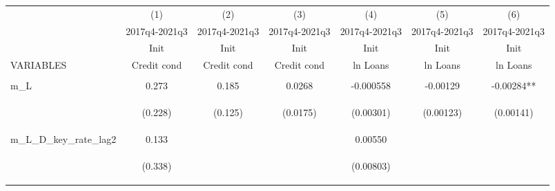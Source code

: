\documentclass[]{article}
\begin{document}
\begin{center}
\begin{tabular}{lcccccc} \hline
 & (1) & (2) & (3) & (4) & (5) & (6) \\
 & 2017q4-2021q3 & 2017q4-2021q3 & 2017q4-2021q3 & 2017q4-2021q3 & 2017q4-2021q3 & 2017q4-2021q3 \\
 & Init & Init & Init & Init & Init & Init \\
VARIABLES & Credit cond & Credit cond & Credit cond & ln Loans & ln Loans & ln Loans \\ \hline
\vspace{4pt} & \begin{footnotesize}\end{footnotesize} & \begin{footnotesize}\end{footnotesize} & \begin{footnotesize}\end{footnotesize} & \begin{footnotesize}\end{footnotesize} & \begin{footnotesize}\end{footnotesize} & \begin{footnotesize}\end{footnotesize} \\
m\_L & 0.273 & 0.185 & 0.0268 & -0.000558 & -0.00129 & -0.00284** \\
\vspace{4pt} & \begin{footnotesize}(0.228)\end{footnotesize} & \begin{footnotesize}(0.125)\end{footnotesize} & \begin{footnotesize}(0.0175)\end{footnotesize} & \begin{footnotesize}(0.00301)\end{footnotesize} & \begin{footnotesize}(0.00123)\end{footnotesize} & \begin{footnotesize}(0.00141)\end{footnotesize} \\
m\_L\_D\_key\_rate\_lag2 & 0.133 &  &  & 0.00550 &  &  \\
\vspace{4pt} & \begin{footnotesize}(0.338)\end{footnotesize} & \begin{footnotesize}\end{footnotesize} & \begin{footnotesize}\end{footnotesize} & \begin{footnotesize}(0.00803)\end{footnotesize} & \begin{footnotesize}\end{footnotesize} & \begin{footnotesize}\end{footnotesize} \\

\end{tabular}
\end{center}
\end{document}
